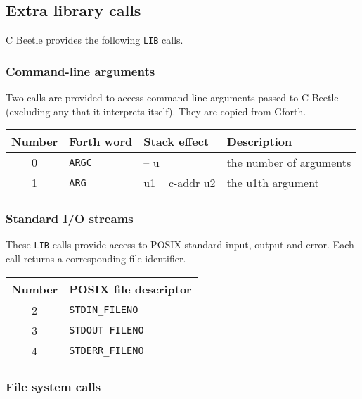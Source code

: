 \documentclass[english]{article}
\newcommand{\spic}[1]{{\spfont\setlength{\baselineskip}{\normalbaselineskip}#1\/}}
\begin{document}
\subsection{Extra library calls}

C Beetle provides the following {\tt LIB} calls.

\subsubsection{Command-line arguments}

Two calls are provided to access command-line arguments passed to C Beetle (excluding any that it interprets itself). They are copied from Gforth.

\begin{center}
\begin{tabular}{S[table-format=2.0]lll} \toprule
\bf Number & \bf Forth word & \bf Stack effect & \bf Description \\  & {\tt ARGC} & \spic{-- u} & the number of arguments \\
1 & {\tt ARG} & \spic{u1 -- c-addr u2} & the \spic{u1}th argument \\ \bottomrule
\end{tabular}
\end{center}

\subsubsection{Standard I/O streams}

These {\tt LIB} calls provide access to POSIX standard input, output and error. Each call returns a corresponding file identifier.

\begin{center}
\begin{tabular}{S[table-format=2.0]l} \toprule
\bf Number & \bf POSIX file descriptor \\  & {\tt STDIN\_FILENO} \\
3 & {\tt STDOUT\_FILENO} \\
4 & {\tt STDERR\_FILENO} \\ \bottomrule
\end{tabular}
\end{center}

\subsubsection{File system calls}
\end{document}
